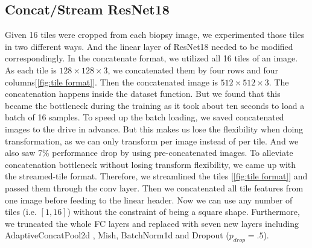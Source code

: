 \documentclass[10pt,twocolumn,letterpaper]{article}
\begin{document}
\subsection{Concat/Stream ResNet18}
 Given 16 tiles were cropped from each biopsy image, we experimented those tiles in two different ways. And the linear layer of ResNet18 needed to be modified correspondingly. In the concatenate format, we utilized all 16 tiles of an image. As each tile is $128 \times 128 \times 3$, we concatenated them by four rows and four columns[\ref{fig:tile format}]. Then the concatenated image is $512 \times 512 \times 3$. The concatenation happens inside the dataset function. But we found that this became the bottleneck during the training as it took about ten seconds to load a batch of 16 samples. To speed up the batch loading, we saved concatenated images to the drive in advance. But this makes us lose the flexibility when doing transformation, as we can only transform per image instead of per tile. And we also saw 7\% performance drop by using pre-concatenated images. To alleviate concatenation bottleneck without losing transform flexibility, we came up with the streamed-tile format.
Therefore, we streamlined the tiles [\ref{fig:tile format}] and passed them through the conv layer. Then we concatenated all tile features from one image before feeding to the linear header. Now we can use any number of tiles (i.e. $[1,16]$) without the constraint of being a square shape. Furthermore, we truncated the whole FC layers and replaced with seven new layers including AdaptiveConcatPool2d \cite{adaptive:fastai}, Mish, BatchNorm1d and Dropout ($p_{drop}=.5$). %
\\
\end{document}
